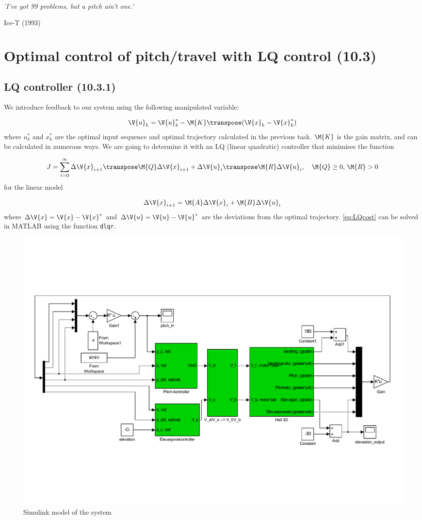 \epigraph{\textit{'I've got 99 problems, but a pitch ain't one.'}}{Ice-T (1993)}

\section{Optimal control of pitch/travel with LQ control (10.3)}

\subsection{LQ controller (10.3.1)}

We introduce feedback to our system using the following manipulated variable:

\begin{equation}
	\V{u}_k = \V{u}_k^* - \M{K} \transpose (\V{x}_k - \V{x}_k^*)
\end{equation}
where $u_k^*$ and $x_k^*$ are the optimal input sequence and optimal trajectory calculated in the previous task. $\M{K}$ is the gain matrix, and can be calculated in numerous ways. We are going to determine it with an LQ (linear quadratic) controller that minimises the function

\begin{equation} \label{eq:LQcost}
	J = \sum\limits_{i=0}^{\infty} \Delta \V{x}_{i+1} \transpose \M{Q} \Delta \V{x}_{i+1} + \Delta \V{u}_{i} \transpose \M{R} \Delta \V{u}_{i}, \quad \M{Q} \geq 0, \, \M{R} > 0
\end{equation}
for the linear model

\begin{equation}
	 \Delta \V{x}_{i+1} = \M{A} \Delta \V{x}_{i} + \M{B} \Delta \V{u}_{i}
\end{equation}
where $\Delta \V{x} = \V{x} - \V{x}^*$ and $\Delta \V{u} = \V{u} - \V{u}^*$ are the deviations from the optimal trajectory. \eqref{eq:LQcost} can be solved in MATLAB using the function \texttt{dlqr}. 

\begin{figure}[H]
	\centering
	\includegraphics[width=\textwidth, trim=2cm 5cm 2cm 2cm]{simulinkmodels/heldag3}
	\caption{Simulink model of the system}
	\label{fig:heldag3}
\end{figure}

